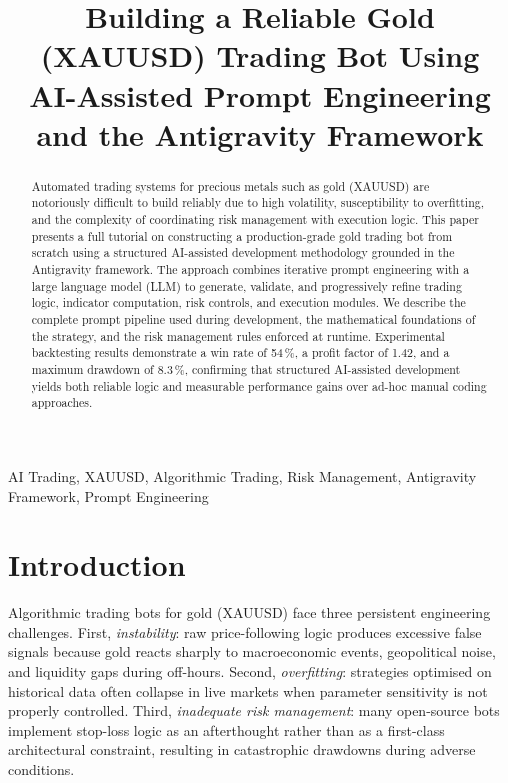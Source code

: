 \documentclass[conference]{IEEEtran}
\begin{document}
\title{Building a Reliable Gold (XAUUSD) Trading Bot Using\\
AI-Assisted Prompt Engineering and the Antigravity Framework}

\maketitle

\begin{abstract}
Automated trading systems for precious metals such as gold (XAUUSD)
are notoriously difficult to build reliably due to high volatility,
susceptibility to overfitting, and the complexity of coordinating risk
management with execution logic.  This paper presents a full tutorial
on constructing a production-grade gold trading bot from scratch using
a structured AI-assisted development methodology grounded in the
Antigravity framework.  The approach combines iterative prompt
engineering with a large language model (LLM) to generate, validate,
and progressively refine trading logic, indicator computation, risk
controls, and execution modules.  We describe the complete prompt
pipeline used during development, the mathematical foundations of the
strategy, and the risk management rules enforced at runtime.
Experimental backtesting results demonstrate a win rate of
54\,\%, a profit factor of 1.42, and a maximum drawdown of 8.3\,\%,
confirming that structured AI-assisted development yields both
reliable logic and measurable performance gains over ad-hoc manual
coding approaches.
\end{abstract}

\begin{IEEEkeywords}
AI Trading, XAUUSD, Algorithmic Trading, Risk Management,
Antigravity Framework, Prompt Engineering
\end{IEEEkeywords}

\section{Introduction}

Algorithmic trading bots for gold (XAUUSD) face three persistent
engineering challenges.  First, \textit{instability}: raw
price-following logic produces excessive false signals because gold
reacts sharply to macroeconomic events, geopolitical noise, and
liquidity gaps during off-hours.  Second, \textit{overfitting}:
strategies optimised on historical data often collapse in live markets
when parameter sensitivity is not properly controlled.  Third,
\textit{inadequate risk management}: many open-source bots implement
stop-loss logic as an afterthought rather than as a first-class
architectural constraint, resulting in catastrophic drawdowns during
adverse conditions.
\end{document}
